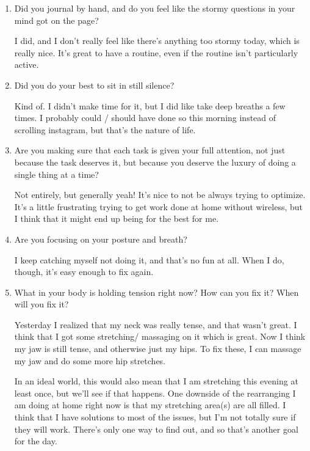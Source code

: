 \documentclass[12pt]{article}
\renewcommand{\,}{\textsuperscript{,}}
\begin{document}
\begin{enumerate}

\item Did you journal by hand, and do you feel like the stormy questions in your mind got on the page?

I did, and I don't really feel like there's anything too stormy today, which is really nice. It's great to have a routine, even if the routine isn't particularly active.

\item Did you do your best to sit in still silence?

Kind of. I didn't make time for it, but I did like take deep breaths a few times. I probably could / should have done so this morning instead of scrolling instagram, but that's the nature of life.

\item Are you making sure that each task is given your full attention, not just because the task deserves it, but because you deserve the luxury of doing a single thing at a time?

Not entirely, but generally yeah! It's nice to not be always trying to optimize. It's a little frustrating trying to get work done at home without wireless, but I think that it might end up being for the best for me.

\item Are you focusing on your posture and breath?

I keep catching myself not doing it, and that's no fun at all.  
When I do, though, it's easy enough to fix again.

\item What in your body is holding tension right now? How can you fix it? When will you fix it?

Yesterday I realized that my neck was really tense, and that wasn't great. I think that I got some stretching/ massaging on it which is great. Now I think my jaw is still tense, and otherwise just my hips.  
To fix these, I can massage my jaw and do some more hip stretches.

In an ideal world, this would also mean that I am stretching this evening at least once, but we'll see if that happens.  
One downside of the rearranging I am doing at home right now is that my stretching area(s) are all filled. I think that I have solutions to most of the issues, but I'm not totally sure if they will work. There's only one way to find out, and so that's another goal for the day.


\end{enumerate}
\end{document}
